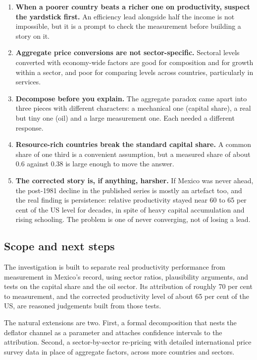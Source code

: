 \documentclass[
  british,
  a4paper,
]{article}
\providecommand{\tightlist}{%
  \setlength{\itemsep}{0pt}\setlength{\parskip}{0pt}}
\begin{document}
\begin{enumerate}
\def\labelenumi{\arabic{enumi}.}
\tightlist
\item
  \textbf{When a poorer country beats a richer one on productivity,
  suspect the yardstick first.} An efficiency lead alongside half the
  income is not impossible, but it is a prompt to check the measurement
  before building a story on it.
\item
  \textbf{Aggregate price conversions are not sector-specific.} Sectoral
  levels converted with economy-wide factors are good for composition
  and for growth within a sector, and poor for comparing levels across
  countries, particularly in services.
\item
  \textbf{Decompose before you explain.} The aggregate paradox came
  apart into three pieces with different characters: a mechanical one
  (capital share), a real but tiny one (oil) and a large measurement
  one. Each needed a different response.
\item
  \textbf{Resource-rich countries break the standard capital share.} A
  common share of one third is a convenient assumption, but a measured
  share of about 0.6 against 0.38 is large enough to move the answer.
\item
  \textbf{The corrected story is, if anything, harsher.} If Mexico was
  never ahead, the post-1981 decline in the published series is mostly
  an artefact too, and the real finding is persistence: relative
  productivity stayed near 60 to 65 per cent of the US level for
  decades, in spite of heavy capital accumulation and rising schooling.
  The problem is one of never converging, not of losing a lead.
\end{enumerate}

\subsection{Scope and next steps}\label{scope-and-next-steps}

The investigation is built to separate real productivity performance
from measurement in Mexico's record, using sector ratios, plausibility
arguments, and tests on the capital share and the oil sector. Its
attribution of roughly 70 per cent to measurement, and the corrected
productivity level of about 65 per cent of the US, are reasoned
judgements built from those tests.

The natural extensions are two. First, a formal decomposition that nests
the deflator channel as a parameter and attaches confidence intervals to
the attribution. Second, a sector-by-sector re-pricing with detailed
international price survey data in place of aggregate factors, across
more countries and sectors.
\end{document}

